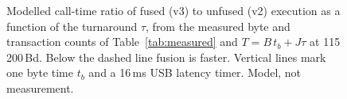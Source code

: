 \begin{figure}[t]
  \centering
  
  \caption{Modelled call-time ratio of fused (v3) to unfused (v2) execution
  as a function of the turnaround $\tau$, from the measured byte and
  transaction counts of Table~\ref{tab:measured} and $T=B\,t_b+J\tau$ at
  115\,200\,Bd. Below the dashed line fusion is faster. Vertical lines mark
  one byte time $t_b$ and a 16\,ms USB latency timer. Model, not measurement.}
  \label{fig:latency}
\end{figure}
